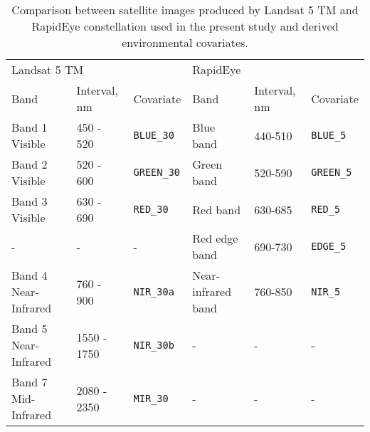 \begin{table}[ht]
  \caption{Comparison between satellite images produced by Landsat 5 TM and RapidEye constellation used in the present study and derived environmental covariates.}
  \label{tab:satellites}
  \centering
  {\small
  \begin{tabular}{llllll}
    \hline
    \multicolumn{3}{l}{Landsat 5 TM}                         & \multicolumn{3}{l}{RapidEye}                           \\
    Band                 & Interval, nm & Covariate          & Band               & Interval, nm & Covariate          \\
    \hline
    Band 1 Visible       & 450 - 520    & \texttt{BLUE\_30}  & Blue band          & 440-510      & \texttt{BLUE\_5}   \\
    Band 2 Visible       & 520 - 600    & \texttt{GREEN\_30} & Green band         & 520-590      & \texttt{GREEN\_5}  \\
    Band 3 Visible       & 630 - 690    & \texttt{RED\_30}   & Red band           & 630-685      & \texttt{RED\_5}    \\
    -                    & -            & -                  & Red edge band      & 690-730      & \texttt{EDGE\_5}   \\
    Band 4 Near-Infrared & 760 - 900    & \texttt{NIR\_30a}  & Near-infrared band & 760-850      & \texttt{NIR\_5}    \\
    Band 5 Near-Infrared & 1550 - 1750  & \texttt{NIR\_30b}  & -                  & -            & -                  \\
    Band 7 Mid-Infrared  & 2080 - 2350  & \texttt{MIR\_30}   & -                  & -            & -                  \\
    \hline
  \end{tabular}}
\end{table}

